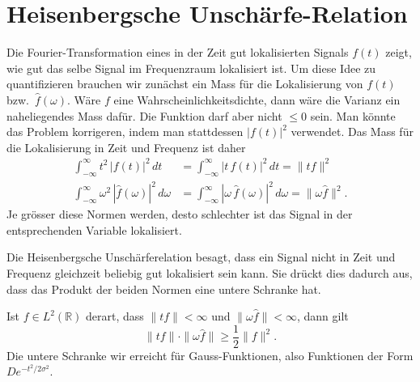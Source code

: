 %
%
%
\section{Heisenbergsche Unschärfe-Relation
\label{section:heisenberg}}
Die Fourier-Transformation eines in der Zeit gut lokalisierten
Signals $f(t)$ zeigt, wie gut das selbe Signal im Frequenzraum
lokalisiert ist.
Um diese Idee zu quantifizieren brauchen wir zunächst ein Mass für
die Lokalisierung von $f(t)$ bzw.~$\hat{f}(\omega)$.
Wäre $f$ eine Wahrscheinlichkeitsdichte, dann wäre die Varianz ein
naheliegendes Mass dafür.
Die Funktion darf aber nicht $\le 0$ sein. Man könnte das Problem korrigeren, indem man stattdessen $|f(t)|^2$ verwendet.
Das Mass für die Lokalisierung in Zeit und Frequenz ist daher
\begin{align*}
\int_{-\infty}^\infty
t^2 \, |f(t)|^2\,dt
&=
\int_{-\infty}^\infty
|t\,f(t)|^2\,dt
=
\|tf\|^2
\\
\int_{-\infty}^\infty
\omega^2\,|\hat{f}(\omega)|^2\,d\omega
&=
\int_{-\infty}^\infty
|\omega\,\hat{f}(\omega)|^2\,d\omega
=
\|\omega \hat{f}\|^2.
\end{align*}
Je grösser diese Normen werden, desto schlechter ist das Signal in der
entsprechenden Variable lokalisiert.

Die Heisenbergsche Unschärferelation besagt, dass ein Signal nicht
in Zeit und Frequenz gleichzeit beliebig gut lokalisiert sein kann.
Sie drückt dies dadurch aus, dass das Produkt der beiden Normen 
eine untere Schranke hat.

\begin{satz}[Heisenberg]
\label{satz:heisenberg}
Ist $f\in L^2(\mathbb R)$ derart, dass 
$\|tf\|<\infty$ und $\|\omega\hat{f}\|<\infty$, dann gilt
\begin{equation}
\| tf \| \cdot \| \omega \hat{f}\| \ge \frac12\| f\|^2.
\label{heisenberg:gleichung}
\end{equation}
Die untere Schranke wir erreicht für Gauss-Funktionen, also Funktionen
der Form $De^{-t^2/2\sigma^2}$.
\end{satz}

